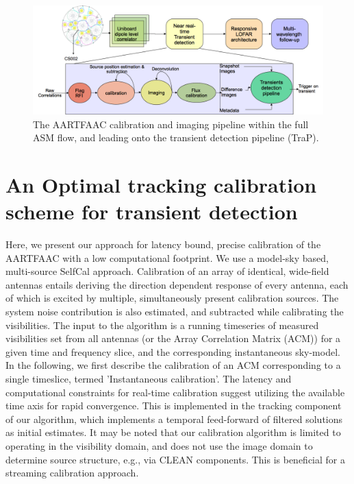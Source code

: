 \documentclass{aa}
\begin{document}
\begin{figure}[tbh]
\centering
\includegraphics[width=1\textwidth]{Figs/AFAAC_blkdia_latest.png}
\caption{\label{fig:The-AARTFAAC-calibration}The    AARTFAAC   calibration   and
  imaging  pipeline within the  full ASM  flow, and  leading onto  the transient
  detection pipeline (TraP).}
\end{figure}

\section{\label{sec:An-Optimal,-tracking}An Optimal tracking calibration
scheme for transient detection}

Here,  we present our  approach for  latency bound,  precise calibration  of the
AARTFAAC  with  a  low  computational  footprint.  We  use  a  model-sky  based,
multi-source  SelfCal approach\citep{wijnholds2009multisource}.   Calibration of
an  array  of identical,  wide-field  antennas  entails  deriving the  direction
dependent  response of every  antenna, each  of which  is excited  by multiple,
simultaneously present  calibration sources.   The system noise  contribution is
also estimated, and subtracted while  calibrating the visibilities. The input to
the  algorithm is a  running timeseries  of measured  visibilities set  from all
antennas (or the Array Correlation Matrix  (ACM)) for a given time and frequency
slice, and the corresponding instantaneous sky-model. In the following, we first
describe the calibration  of an ACM corresponding to  a single timeslice, termed
'Instantaneous  calibration'.  The  latency  and computational  constraints  for
real-time  calibration  suggest utilizing  the  available  time  axis for  rapid
convergence. This  is implemented  in the tracking  component of  our algorithm,
which  implements  a temporal  feed-forward  of  filtered  solutions as  initial
estimates.  It  may  be noted  that  our  calibration  algorithm is  limited  to
operating  in the  visibility  domain, and  does  not use  the  image domain  to
determine source structure, e.g., via CLEAN components. This is beneficial for a
streaming calibration approach.
\end{document}
